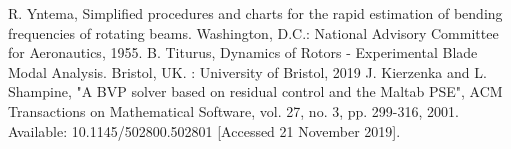 \documentclass[11pt]{article}
\begin{document}
\begin{thebibliography}{}
R. Yntema, Simplified procedures and charts for the rapid estimation of bending frequencies of rotating beams. Washington, D.C.: National Advisory Committee for Aeronautics, 1955.
B. Titurus, Dynamics of Rotors - Experimental Blade Modal Analysis. Bristol, UK. : University of Bristol, 2019
J. Kierzenka and L. Shampine, "A BVP solver based on residual control and the Maltab PSE", ACM Transactions on Mathematical Software, vol. 27, no. 3, pp. 299-316, 2001. Available: 10.1145/502800.502801 [Accessed 21 November 2019].
\end{thebibliography}{}
\appendix
\renewcommand\thefigure{A.\arabic{figure}}  
\setcounter{figure}{0}
\end{document}
